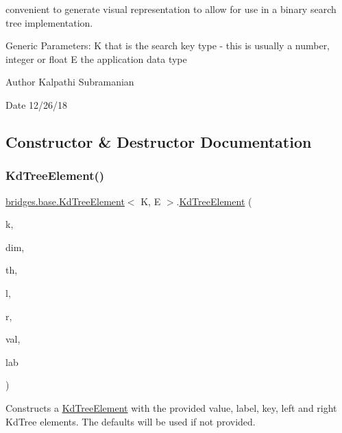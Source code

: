 convenient to generate visual representation to allow for use in a binary search tree implementation.

Generic Parameters\+: K that is the search key type -\/ this is usually a number, integer or float E the application data type

\begin{DoxyAuthor}{Author}
Kalpathi Subramanian 
\end{DoxyAuthor}
\begin{DoxyDate}{Date}
12/26/18 
\end{DoxyDate}


\subsection{Constructor \& Destructor Documentation}
\mbox{\label{classbridges_1_1base_1_1_kd_tree_element_a6acdec52089792d20747c10f56139217}} 
\subsubsection{\texorpdfstring{Kd\+Tree\+Element()}{KdTreeElement()}\hspace{0.1cm}{\footnotesize\ttfamily [1/10]}}
{\footnotesize\ttfamily \mbox{\hyperlink{classbridges_1_1base_1_1_kd_tree_element}{bridges.\+base.\+Kd\+Tree\+Element}}$<$ K, E $>$.\mbox{\hyperlink{classbridges_1_1base_1_1_kd_tree_element}{Kd\+Tree\+Element}} (\begin{DoxyParamCaption}\item[{K}]{k,  }\item[{int}]{dim,  }\item[{float}]{th,  }\item[{\mbox{\hyperlink{classbridges_1_1base_1_1_kd_tree_element}{Kd\+Tree\+Element}}$<$ K, E $>$}]{l,  }\item[{\mbox{\hyperlink{classbridges_1_1base_1_1_kd_tree_element}{Kd\+Tree\+Element}}$<$ K, E $>$}]{r,  }\item[{E}]{val,  }\item[{String}]{lab }\end{DoxyParamCaption})}

Constructs a \mbox{\hyperlink{classbridges_1_1base_1_1_kd_tree_element}{Kd\+Tree\+Element}} with the provided value, label, key, left and right Kd\+Tree elements. The defaults will be used if not provided.


